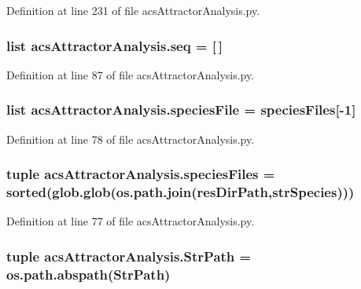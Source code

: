 Definition at line 231 of file acs\-Attractor\-Analysis.\-py.

\hypertarget{a00096_a33bc0e3fc99bab3df33d3f1626a19528}{
\subsubsection[{seq}]{\setlength{\rightskip}{0pt plus 5cm}list acs\-Attractor\-Analysis.\-seq = \mbox{[}$\,$\mbox{]}}}\label{a00096_a33bc0e3fc99bab3df33d3f1626a19528}


Definition at line 87 of file acs\-Attractor\-Analysis.\-py.

\hypertarget{a00096_a0e036b776f4f724254115c2e284657eb}{
\subsubsection[{species\-File}]{\setlength{\rightskip}{0pt plus 5cm}list acs\-Attractor\-Analysis.\-species\-File = {\bf species\-Files}\mbox{[}-\/1\mbox{]}}}\label{a00096_a0e036b776f4f724254115c2e284657eb}


Definition at line 78 of file acs\-Attractor\-Analysis.\-py.

\hypertarget{a00096_a670249d163388a9d93c8f3b9fb63afac}{
\subsubsection[{species\-Files}]{\setlength{\rightskip}{0pt plus 5cm}tuple acs\-Attractor\-Analysis.\-species\-Files = sorted(glob.\-glob(os.\-path.\-join({\bf res\-Dir\-Path},{\bf str\-Species})))}}\label{a00096_a670249d163388a9d93c8f3b9fb63afac}


Definition at line 77 of file acs\-Attractor\-Analysis.\-py.

\hypertarget{a00096_a60fb7d39ab8835d4b764461220e796e2}{
\subsubsection[{Str\-Path}]{\setlength{\rightskip}{0pt plus 5cm}tuple acs\-Attractor\-Analysis.\-Str\-Path = os.\-path.\-abspath(Str\-Path)}}\label{a00096_a60fb7d39ab8835d4b764461220e796e2}


